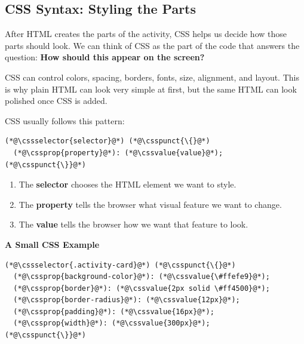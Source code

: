 \documentclass{article}
\begin{document}
\vspace{0.3cm}


\subsection*{\Bitter\textcolor{naranja}{CSS Syntax: Styling the Parts}}
\label{subsec:css-syntax}

After HTML creates the parts of the activity, CSS helps us decide how those parts should look.
We can think of CSS as the part of the code that answers the question:
\textbf{How should this appear on the screen?}

CSS can control colors, spacing, borders, fonts, size, alignment, and layout.
This is why plain HTML can look very simple at first, but the same HTML can look polished once CSS is added.

\vspace{0.2cm}

CSS usually follows this pattern:

\begin{lstlisting}
(*@\cssselector{selector}@*) (*@\csspunct{\{}@*)
  (*@\cssprop{property}@*): (*@\cssvalue{value}@*);
(*@\csspunct{\}}@*)
\end{lstlisting}

\begin{enumerate}
  \item The \textbf{selector} chooses the HTML element we want to style.
  \item The \textbf{property} tells the browser what visual feature we want to change.
  \item The \textbf{value} tells the browser how we want that feature to look.
\end{enumerate}

\vspace{0.3cm}

\textbf{\Bitter\textcolor{naranja}{A Small CSS Example}}

\vspace{0.1cm}

\begin{lstlisting}
(*@\cssselector{.activity-card}@*) (*@\csspunct{\{}@*)
  (*@\cssprop{background-color}@*): (*@\cssvalue{\#ffefe9}@*);
  (*@\cssprop{border}@*): (*@\cssvalue{2px solid \#ff4500}@*);
  (*@\cssprop{border-radius}@*): (*@\cssvalue{12px}@*);
  (*@\cssprop{padding}@*): (*@\cssvalue{16px}@*);
  (*@\cssprop{width}@*): (*@\cssvalue{300px}@*);
(*@\csspunct{\}}@*)
\end{lstlisting}
\end{document}
